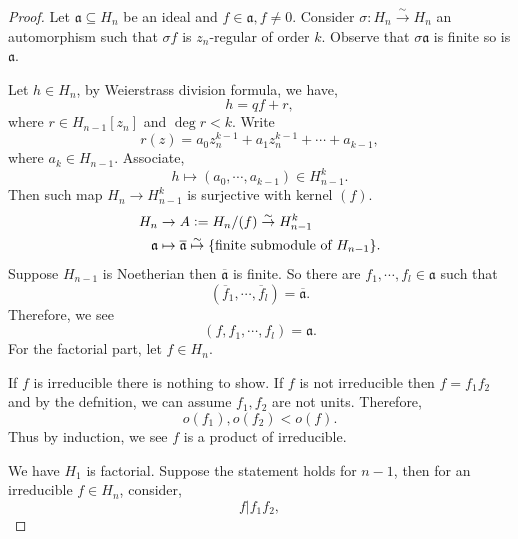 \documentclass{article}
\newcommand{\defeq}{\vcentcolon=}
\begin{document}
\begin{proof}
  Let $\mathfrak{a}\subseteq H_n$ be an ideal and $f\in\mathfrak{a} ,f\not=0$. Consider $\sigma:H_n\stackrel{\sim}{\to}H_n$ an automorphism such that $\sigma f$ is $z_n$-regular of order $k$. Observe that 
  $\sigma\mathfrak{a}$ is finite so is $\mathfrak{a}$.
  \par Let $h\in H_n$, by Weierstrass division formula, we have,
  \begin{equation*}
    h = qf+r,
  \end{equation*}
  where $r\in H_{n-1}[z_n]$ and $\deg r <k$. Write 
  \begin{equation*}
    r(z) = a_0z_n^{k-1}+a_1z_n^{k-1}+\cdots +a_{k-1},
  \end{equation*}
  where $a_k\in H_{n-1}$. Associate,
  \begin{equation*}
    h\mapsto(a_0,\cdots,a_{k-1})\in H_{n-1}^k.
  \end{equation*}
  Then such map $H_n\to H_{n-1}^k$ is surjective with kernel $(f)$. 
  \begin{align*}
    H_n&\to A \defeq H_n/(f)\stackrel{\sim}{\to} H_{n-1}^k \\
    \mathfrak{a}&\mapsto \overline{\mathfrak{a}}\stackrel{\sim}{\mapsto}\{\text{finite submodule of $H_{n-1}$}\}.
  \end{align*}
  Suppose $H_{n-1}$ is Noetherian then $\overline{\mathfrak{a}}$ is finite. So there are $f_1,\cdots, f_l\in\mathfrak{a}$ such that 
  \begin{equation*}
    (\overline{f}_1,\cdots,\overline{f}_l) = \overline{\mathfrak{a}}.
  \end{equation*}
  Therefore, we see 
  \begin{equation*}
    (f,f_1,\cdots,f_l) = \mathfrak{a}.
  \end{equation*}
  For the factorial part, let $f\in H_n$.
  \par If $f$ is irreducible there is nothing to show. If $f$ is not irreducible then $f = f_1f_2$ and by the defnition, we can assume $f_1,f_2$ are not units. Therefore,
  \begin{equation*}
    o(f_1),o(f_2)<o(f).
  \end{equation*}
  Thus by induction, we see $f$ is a product of irreducible.
  \par We have $H_1$ is factorial. Suppose the statement holds for $n-1$, then for an irreducible $f\in H_n$, consider,
  \begin{equation*}
    f|f_1f_2,
  \end{equation*}

\end{proof}
\end{document}
